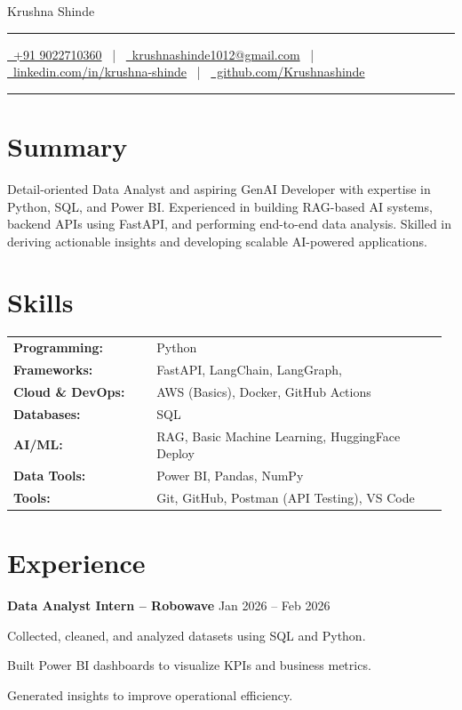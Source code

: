 \documentclass[letterpaper,10pt]{article}
\newcommand{\documentTitle}[2]{
  \begin{center}
    {\Huge\color{accentTitle} #1}\\[6pt]
    {\color{accentLine}\hrule}\vspace{2pt}
    {\footnotesize #2}\par\vspace{2pt}
    {\color{accentLine}\hrule}
  \end{center}
}
\newenvironment{resume_list}{
  \vspace{-4pt}
  \begin{itemize}[leftmargin=18pt, itemsep=-3pt]
}{
  \end{itemize}
}
\begin{document}
\documentTitle{Krushna Shinde}{
  \href{tel:+919022710360}{\faPhone\ +91 9022710360} ~|~
  \href{mailto:krushnashinde1012@gmail.com}{\faEnvelope\ krushnashinde1012@gmail.com} ~|~
  \href{https://www.linkedin.com/in/krushna-shinde-549165276/}{\faLinkedin\ linkedin.com/in/krushna-shinde} ~|~
  \href{https://github.com/Krishna101211}{\faGithub\ github.com/Krushnashinde}
}


\section*{Summary}
Detail-oriented Data Analyst and aspiring GenAI Developer with expertise in Python, SQL, and Power BI. Experienced in building RAG-based AI systems, backend APIs using FastAPI, and performing end-to-end data analysis. Skilled in deriving actionable insights and developing scalable AI-powered applications.


\section*{Skills}
\begin{tabular}{p{0.32\linewidth} p{0.65\linewidth}}
  \textbf{Programming:} & Python\\
  \textbf{Frameworks:} & FastAPI, LangChain, LangGraph,\\
  \textbf{Cloud \& DevOps:} & AWS (Basics), Docker, GitHub Actions \\
  \textbf{Databases:} & SQL\\
  \textbf{AI/ML:} & RAG, Basic Machine Learning, HuggingFace Deploy \\
  \textbf{Data Tools:} & Power BI, Pandas, NumPy \\
  \textbf{Tools:} & Git, GitHub, Postman (API Testing), VS Code \\
\end{tabular}


\section*{Experience}

\textbf{Data Analyst Intern – Robowave} \hfill Jan 2026 – Feb 2026
\begin{resume_list}
  \item Collected, cleaned, and analyzed datasets using SQL and Python.
  \item Built Power BI dashboards to visualize KPIs and business metrics.
  \item Generated insights to improve operational efficiency.
\end{resume_list}
\end{document}
